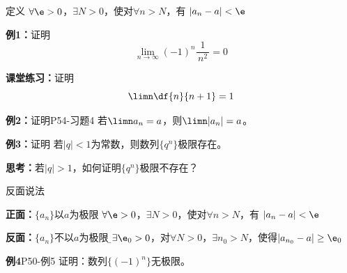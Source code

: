 \begin{frame}
	\linespread{1.4}
	\begin{block}{定义}
		{\bb $\forall\e>0$，$\exists N>0$，使对$\forall n>N$，有
		$|a_n-a|<\e$}
	\end{block}\pause
	\begin{exampleblock}{{\bf 例1：}证明}
		$$\lim\limits_{n\to\infty}(-1)^n\displaystyle\frac{1}{\,n^2\,}=0$$\pause
	\end{exampleblock}
	\pause
	\begin{exampleblock}{{\bf 课堂练习：}证明}
		$$\limn\df{n}{n+1}=1$$
	\end{exampleblock}
\end{frame}

\begin{frame}
	\linespread{1.5}
	\begin{exampleblock}{{\bf 例2：}证明\hfill P54-习题4}
		若$\limn a_n=a$，则$\limn|a_n|=a$。
	\end{exampleblock}
	\bigskip\pause 
	\begin{exampleblock}{{\bf 例3：}证明}
		若$|q|<1$为常数，则数列$\{q^n\}$极限存在。
	\end{exampleblock}
	\pause
	\alert{\bf 思考：}若$|q|>1$，如何证明$\{q^n\}$极限不存在？
\end{frame}

\begin{frame}{反面说法}
	\linespread{1.5}\pause 
	\begin{block}{{\bf 正面：}$\{a_n\}$以$a$为极限}
		{ $\forall\e>0$，$\exists N>0$，使对$\forall n>N$，有
		$|a_n-a|<\e$}
	\end{block}\pause 
	\begin{alertblock}{{\bf 反面：}$\{a_n\}$不以$a$为极限}\pause 
		{\b $\exists\e_0>0$，\pause 对$\forall N>0$，\pause $\exists
		n_0>N$，\pause 使得$|a_{n_0}-a|\geq\e_0$ }
	\end{alertblock}\pause 
	\begin{exampleblock}{{\bf 例4}\hfill P50-例5}
		证明：数列$\{(-1)^n\}$无极限。
	\end{exampleblock}
\end{frame}

